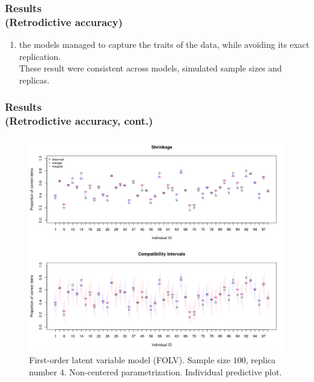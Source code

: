 \documentclass[nonav,sleutel]{beamer}
\begin{document}
	\begin{frame}
		\frametitle{Results \\
			(Retrodictive accuracy)}
		\begin{enumerate}
			\item the models managed to capture the traits of the data, while avoiding its exact replication.\\
			\vspace{0.3cm} These result were consistent across models, simulated sample sizes and replicas.
		\end{enumerate} 
	\end{frame}
	\begin{frame}
		\frametitle{Results \\
			(Retrodictive accuracy, cont.)}
		\begin{figure}[H]
			\centering
			\includegraphics[width=0.68\linewidth]{FOLV_NC_J100_Ndata4_HitRate_ind}
			\caption{First-order latent variable model (FOLV). Sample size $100$, replica number $4$. Non-centered parametrization. Individual predictive plot.}
			\label{fig:FOLV_NC_hitrate_ind}
		\end{figure} 
	\end{frame}
\end{document}

